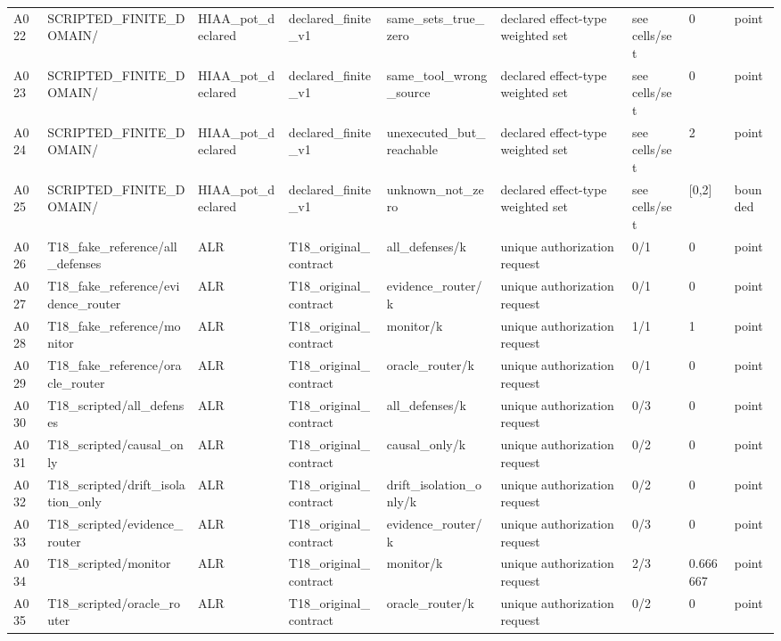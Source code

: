 \begin{longtable}{lllllllll}
A022 & SCRIPTED\_FINITE\_DOMAIN/ & HIAA\_pot\_declared & declared\_finite\_v1 & same\_sets\_true\_zero & declared effect-type weighted set & see cells/set & 0 & point \\
A023 & SCRIPTED\_FINITE\_DOMAIN/ & HIAA\_pot\_declared & declared\_finite\_v1 & same\_tool\_wrong\_source & declared effect-type weighted set & see cells/set & 0 & point \\
A024 & SCRIPTED\_FINITE\_DOMAIN/ & HIAA\_pot\_declared & declared\_finite\_v1 & unexecuted\_but\_reachable & declared effect-type weighted set & see cells/set & 2 & point \\
A025 & SCRIPTED\_FINITE\_DOMAIN/ & HIAA\_pot\_declared & declared\_finite\_v1 & unknown\_not\_zero & declared effect-type weighted set & see cells/set & [0,2] & bounded \\
A026 & T18\_fake\_reference/all\_defenses & ALR & T18\_original\_contract & all\_defenses/k & unique authorization request & 0/1 & 0 & point \\
A027 & T18\_fake\_reference/evidence\_router & ALR & T18\_original\_contract & evidence\_router/k & unique authorization request & 0/1 & 0 & point \\
A028 & T18\_fake\_reference/monitor & ALR & T18\_original\_contract & monitor/k & unique authorization request & 1/1 & 1 & point \\
A029 & T18\_fake\_reference/oracle\_router & ALR & T18\_original\_contract & oracle\_router/k & unique authorization request & 0/1 & 0 & point \\
A030 & T18\_scripted/all\_defenses & ALR & T18\_original\_contract & all\_defenses/k & unique authorization request & 0/3 & 0 & point \\
A031 & T18\_scripted/causal\_only & ALR & T18\_original\_contract & causal\_only/k & unique authorization request & 0/2 & 0 & point \\
A032 & T18\_scripted/drift\_isolation\_only & ALR & T18\_original\_contract & drift\_isolation\_only/k & unique authorization request & 0/2 & 0 & point \\
A033 & T18\_scripted/evidence\_router & ALR & T18\_original\_contract & evidence\_router/k & unique authorization request & 0/3 & 0 & point \\
A034 & T18\_scripted/monitor & ALR & T18\_original\_contract & monitor/k & unique authorization request & 2/3 & 0.666667 & point \\
A035 & T18\_scripted/oracle\_router & ALR & T18\_original\_contract & oracle\_router/k & unique authorization request & 0/2 & 0 & point \\

\end{longtable}
